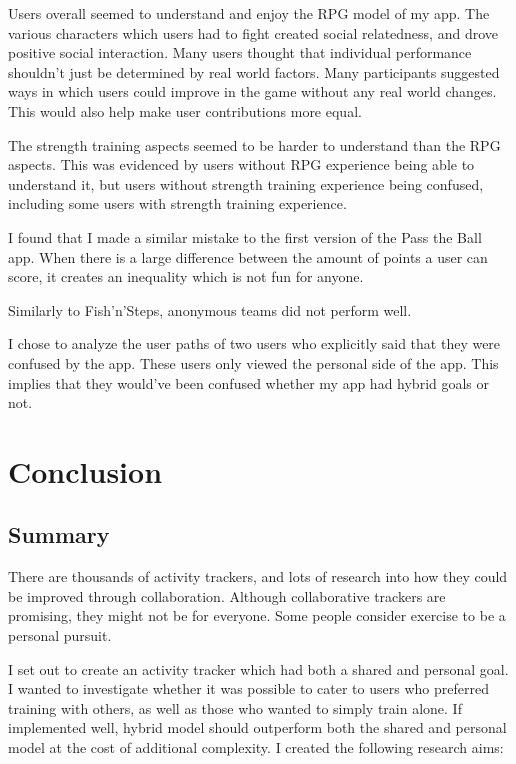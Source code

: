 \documentclass{l4proj}
\begin{document}
Users overall seemed to understand and enjoy the RPG model of my app. The various characters which users had to fight created social relatedness, and drove positive social interaction. Many users thought that individual performance shouldn't just be determined by real world factors. Many participants suggested ways in which users could improve in the game without any real world changes. This would also help make user contributions more equal. 

The strength training aspects seemed to be harder to understand than the RPG aspects. This was evidenced by users without RPG experience being able to understand it, but users without strength training experience being confused, including some users with strength training experience.

I found that I made a similar mistake to the first version of the Pass the Ball app. When there is a large difference between the amount of points a user can score, it creates an inequality which is not fun for anyone.

Similarly to Fish'n'Steps, anonymous teams did not perform well.

I chose to analyze the user paths of two users who explicitly said that they were confused by the app. These users only viewed the personal side of the app. This implies that they would've been confused whether my app had hybrid goals or not.



\chapter{Conclusion}    
\section{Summary}
There are thousands of activity trackers, and lots of research into how they could be improved through collaboration. Although collaborative trackers are promising, they might not be for everyone. Some people consider exercise to be a personal pursuit.

I set out to create an activity tracker which had both a shared and personal goal. I wanted to investigate whether it was possible to cater to users who preferred training with others, as well as those who wanted to simply train alone. If implemented well, hybrid model should outperform both the shared and personal model at the cost of additional complexity. I created the following research aims:
\end{document}
